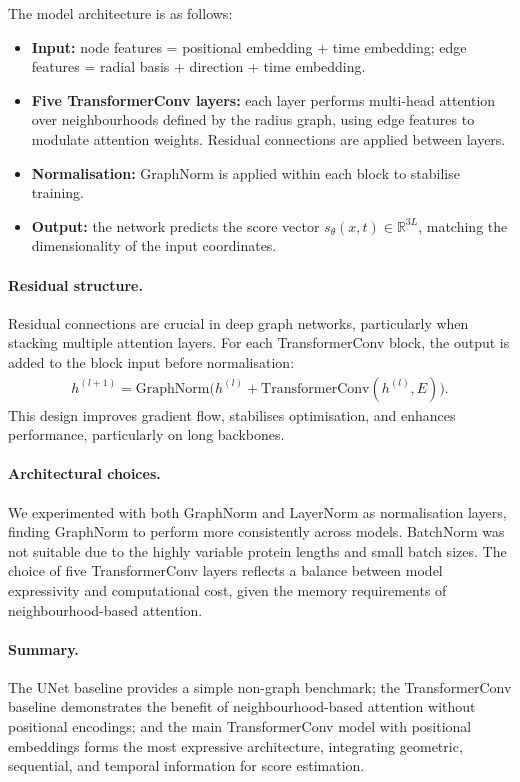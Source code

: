 \documentclass[a4paper,12pt]{article}
\begin{document}
The model architecture is as follows:
\begin{itemize}
    \item \textbf{Input:} node features = positional embedding + time embedding; edge features = radial basis + direction + time embedding.  
    \item \textbf{Five TransformerConv layers:} each layer performs multi-head attention over neighbourhoods defined by the radius graph, using edge features to modulate attention weights. Residual connections are applied between layers.  
    \item \textbf{Normalisation:} GraphNorm is applied within each block to stabilise training.  
    \item \textbf{Output:} the network predicts the score vector \(s_\theta(x,t) \in \mathbb{R}^{3L}\), matching the dimensionality of the input coordinates.  
\end{itemize}

\paragraph{Residual structure.}
Residual connections are crucial in deep graph networks, particularly when stacking multiple attention layers. 
For each TransformerConv block, the output is added to the block input before normalisation:
\begin{align*}
    h^{(l+1)} = \mathrm{GraphNorm}\!\big(h^{(l)} + \mathrm{TransformerConv}(h^{(l)}, E)\big).
\end{align*}
This design improves gradient flow, stabilises optimisation, and enhances performance, particularly on long backbones.

\paragraph{Architectural choices.}
We experimented with both GraphNorm and LayerNorm as normalisation layers, finding GraphNorm to perform more consistently across models. 
BatchNorm was not suitable due to the highly variable protein lengths and small batch sizes. 
The choice of five TransformerConv layers reflects a balance between model expressivity and computational cost, given the memory requirements of neighbourhood-based attention. 

\paragraph{Summary.}
The UNet baseline provides a simple non-graph benchmark; the TransformerConv baseline demonstrates the benefit of neighbourhood-based attention without positional encodings; and the main TransformerConv model with positional embeddings forms the most expressive architecture, integrating geometric, sequential, and temporal information for score estimation.
\end{document}
